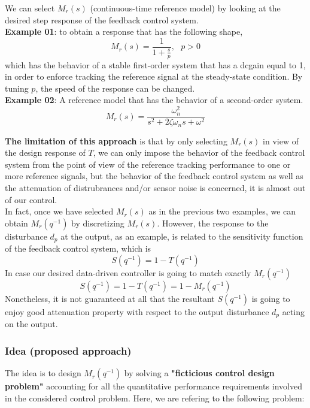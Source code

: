 \begin{example}[Examples]
We can select $M_r(s)$ (continuous-time reference model) by looking at the desired step response of the feedback control system. \\

\textbf{Example 01}: to obtain a response that has the following shape,
\[
M_r(s) = \frac{1}{1+ \frac{s}{p}}, \:\:\: p > 0 
\]
which has the behavior of a stable first-order system that has a dcgain equal to 1, in order to enforce tracking the reference signal at the steady-state condition. By tuning $p$, the speed of the response can be changed.\\

\textbf{Example 02}:
A reference model that has the behavior of a second-order system.
\[
M_r(s) = \frac{\omega_n^2}{s^2 + 2 \zeta \omega_n s + \omega^2}
\]
\end{example}

\textbf{The limitation of this approach} is that by only selecting $M_r(s)$ in view of the design response of $T$, we can only impose the behavior of the feedback control system from the point of view of the reference tracking performance to one or more reference signals, but the behavior of the feedback control system as well as the attenuation of distrubrances and/or sensor noise is concerned, it is almost out of our control. \\

In fact, once we have selected $M_r(s)$ as in the previous two examples, we can obtain $M_r(q^{-1})$ by discretizing $M_r(s)$. However, the response to the disturbance $d_p$ at the output, as an example, is related to the sensitivity function of the feedback control system, which is 
\[
S(q^{-1}) = 1 - T(q^{-1})
\]
In case our desired data-driven controller is going to match exactly $M_r(q^{-1})$\\
\[
S(q^{-1}) = 1 - T(q^{-1}) = 1 - M_r(q^{-1})
\]
Nonetheless, it is not guaranteed at all that the resultant $S(q^{-1})$ is going to enjoy good attenuation property with respect to the output disturbance $d_p$ acting on the output.\\

\subsubsection{Idea (proposed approach)}
The idea is to design $M_r(q^{-1})$ by solving a \textbf{\textbf{"ficticious control design problem"}} accounting for all the quantitative performance requirements involved in the considered control problem. Here, we are refering to the following problem:\\

